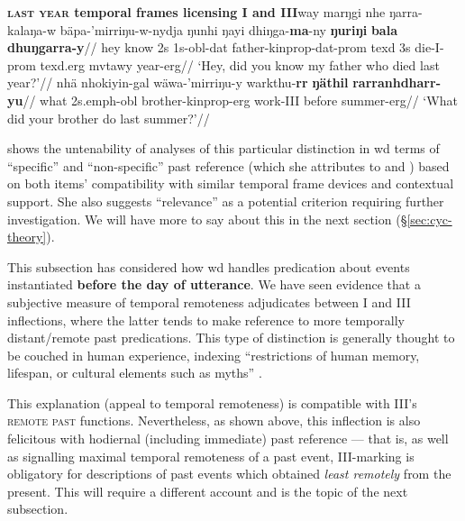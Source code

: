 \pex{}\textbf{\textsc{last year} temporal frames licensing \gls{I} and \gls{III}}\a\begingl\gla way marŋgi nhe ŋarra-kalaŋa-w bäpa-'mirriŋu-w-nydja ŋunhi ŋayi dhiŋga-\textbf{ma}-ny \textbf{ŋuriŋi} \textbf{bala} \textbf{dhuŋgarra-y}//
\glb hey know 2s 1s-\gls{obl}-\gls{dat} father-\gls{kinprop}-\gls{dat}-\gls{prom} \gls{texd} 3s die-\gls{I}-\gls{prom} \gls{texd}.\gls{erg} \gls{mvtawy} year-\gls{erg}//
\glft`Hey, did you know my father who died last year?'//\endgl
\a\begingl\gla nhä nhokiyin-gal wäwa-'mirriŋu-y warkthu-\textbf{rr} \textbf{ŋäthil} \textbf{rarranhdharr-yu}//
\glb what 2s.\gls{emph}-\gls{obl} brother-\gls{kinprop}-\gls{erg} work-\gls{III} before summer-\gls{erg}//
\glft`What did your brother do last summer?'//\endgl
\xe

\noindent \citeauthor{Wilkinson} shows the untenability of analyses of this particular distinction in \acrshort{wd} terms of ``specific'' and ``non-specific'' past reference (which she attributes to \citealp[178]{Waters1989} and \citealp{Lowe1996}) based on both items' compatibility with similar temporal frame devices and contextual support. She also suggests ``relevance'' as a potential criterion requiring further investigation. We will have more to say about this in the next section (\S\ref{sec:cyc-theory}).


This subsection has considered how \gls{wd} handles predication about events instantiated \textbf{before the day of utterance}. We have seen evidence that a subjective measure of temporal remoteness adjudicates between \gls{I} and \gls{III} inflections, where the latter tends to make reference to more temporally distant/remote past predications. This type of distinction is generally thought to be couched in human experience, indexing ``restrictions of human memory, lifespan, or cultural elements such as myths'' \citep[544]{Botne2012}.

This explanation (appeal to temporal remoteness) is compatible with \gls{III}'s \textsc{remote past} functions. Nevertheless, as shown above, this inflection is also felicitous with hodiernal (including immediate) past reference --- that is, as well as signalling maximal temporal remoteness of a past event, \gls{III}-marking is obligatory for descriptions of past events which obtained \textit{least remotely} from the present. This will require a different account and is the topic of the next subsection.

